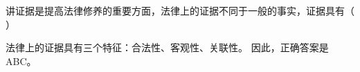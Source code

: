 \question 讲证据是提高法律修养的重要方面，法律上的证据不同于一般的事实，证据具有（
）
\par{}
\begin{solution}法律上的证据具有三个特征：合法性、客观性、关联性。 因此，正确答案是ABC。
\end{solution}
